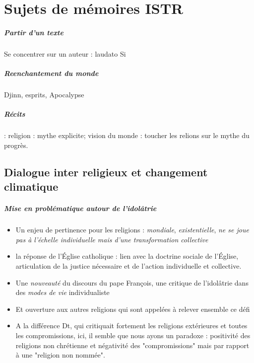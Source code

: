 \chapter{Sujets de mémoires ISTR}


\paragraph{Partir d'un texte} 
Se concentrer sur un auteur : laudato Si

\paragraph{Reenchantement du monde}
 Djinn, esprits, Apocalypse

\paragraph{Récits}
 : religion : mythe explicite; vision du monde : toucher les relions sur le mythe du progrès. 


\section{Dialogue inter religieux et changement climatique}

\paragraph{Mise en problématique autour de l'idolâtrie}
\begin{itemize}
    \item Un enjeu de pertinence pour les religions : \textit{mondiale}, \textit{existentielle}, \textit{ne se joue pas à l'échelle individuelle mais d'une transformation collective}
    \item la réponse de l'Église catholique : lien avec la doctrine sociale de l'Église, articulation de la justice nécessaire et de l'action individuelle et collective. 
    \item Une \textit{nouveauté} du discours du pape François, une critique de l'idolâtrie dans des \textit{modes de vie} individualiste
    \item Et ouverture aux autres religions qui sont appelées à relever ensemble ce défi
    \item A la différence Dt, qui critiquait fortement les religions extérieures et toutes les compromissions, ici, il semble que nous ayons un paradoxe : positivité des religions non chrétienne et négativité des "compromissions" mais par rapport à une "religion non nommée".
  
\end{itemize}


